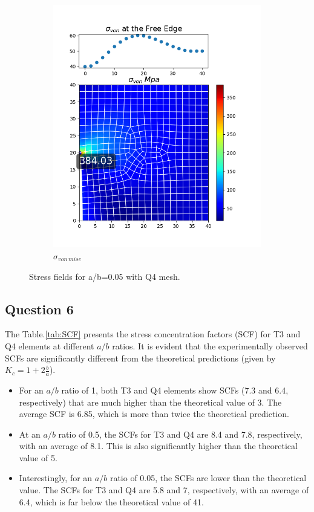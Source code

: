 \documentclass[twoside,twocolumn,10pt]{article}
\begin{document}
\begin{figure}[!ht]
\begin{subfigure}[c]{0.26\textwidth}
    \includegraphics[width=1.\linewidth]{Q2_5/Q5_0.05_von_quad.png}
    \caption{$\sigma_{von \, mise}$}
    \label{fig:von_quad_0.05}
  \end{subfigure}
  \caption{Stress fields for a/b=0.05 with Q4 mesh.}
  \label{fig:quad_0.05}
\end{figure}

\subsection{Question 6}
The Table.\ref{tab:SCF} presents the stress concentration factors (SCF) for T3 and Q4 elements at different \(a/b\) ratios. It is evident that the experimentally observed SCFs are significantly different from the theoretical predictions (given by $K_c=1+2 \frac{b}{a}$).

\begin{itemize}
    \item For an \(a/b\) ratio of 1, both T3 and Q4 elements show SCFs (7.3 and 6.4, respectively) that are much higher than the theoretical value of 3. The average SCF is 6.85, which is more than twice the theoretical prediction.
    \item At an \(a/b\) ratio of 0.5, the SCFs for T3 and Q4 are 8.4 and 7.8, respectively, with an average of 8.1. This is also significantly higher than the theoretical value of 5.
    \item Interestingly, for an \(a/b\) ratio of 0.05, the SCFs are lower than the theoretical value. The SCFs for T3 and Q4 are 5.8 and 7, respectively, with an average of 6.4, which is far below the theoretical value of 41.
\end{itemize}
\end{document}
